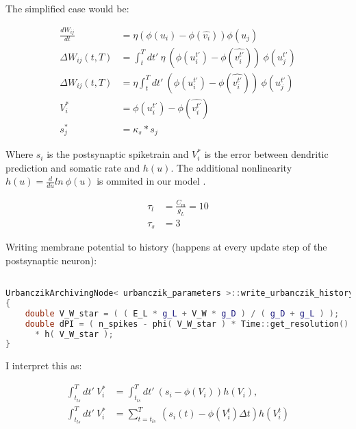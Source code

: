 The simplified \cite{sacramento2018dendritic} case would be:

\begin{align}
  \frac{dW_{ij}}{dt} & = \eta (\phi(u_i) - \phi(\hat{v_i})) \phi(u_j)                                         \\
  \Delta W_{ij}(t,T) & = \int_t^T dt' \ \eta \  (\phi(u_i^{t'}) - \phi(\widehat{v_i^{t'}})) \  \phi(u_j^{t'}) \\
  \Delta W_{ij}(t,T) & = \eta \int_t^T dt' \  (\phi(u_i^{t'}) - \phi(\widehat{v_i^{t'}})) \ \phi(u_j^{t'})    \\
  V_i^*              & = \phi(u_i^{t'}) - \phi(\widehat{v_i^{t'}})                                            \\
  s_j^*              & = \kappa_s * s_j
\end{align}


Where $s_i$ is the postsynaptic spiketrain and $V_i^*$ is the error between dendritic prediction and somatic rate and $h( u )$. The additional nonlinearity $h( u ) = \frac{d}{du} ln \  \phi(u)$ is ommited in our model .



\begin{align}
  \tau_l & = \frac{C_m}{g_L} = 10 \\
  \tau_s & = 3
\end{align}

Writing membrane potential to history (happens at every update step of the postsynaptic neuron):

\begin{lstlisting}[language=C++, directivestyle={\color{black}}
                   emph={int,char,double,float,unsigned,exp},
                   emphstyle={\color{blue}}]

UrbanczikArchivingNode< urbanczik_parameters >::write_urbanczik_history(Time t, double V_W, int n_spikes, int comp)
{
	double V_W_star = ( ( E_L * g_L + V_W * g_D ) / ( g_D + g_L ) );
	double dPI = ( n_spikes - phi( V_W_star ) * Time::get_resolution().get_ms() )
      * h( V_W_star );
}\end{lstlisting}

I interpret this as:


\begin{align}
  \int_{t_{ls}}^T dt' \ V_i^* & = \int_{t_{ls}}^T dt' \  (s_i - \phi(V_i )) h(V_i),               \\
  \int_{t_{ls}}^T dt' \ V_i^* & = \sum_{t=t_{ls}}^T \  (s_i(t) -  \phi(V_i^t ) \Delta t) h(V_i^t) \\
\end{align}

